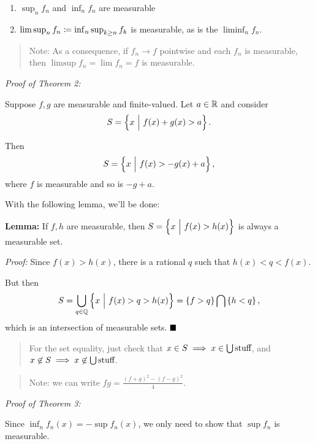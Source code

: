 \begin{enumerate}
\def\labelenumi{\arabic{enumi}.}
\tightlist
\item
  \(\sup_n f_n\) and \(\inf_n f_n\) are measurable
\item
  \(\limsup_n f_n \coloneqq \inf_n \sup_{k\geq n} f_k\) is measurable,
  as is the \(\liminf_n f_n\).
\end{enumerate}

\begin{quote}
Note: As a consequence, if \(f_n \to f\) pointwise and each \(f_n\) is
measurable, then \(\limsup f_n = \lim f_n = f\) is measurable.
\end{quote}

\emph{Proof of Theorem 2:}

Suppose \(f,g\) are measurable and finite-valued. Let \(a\in {\mathbb{R}}\) and
consider
\begin{align*}
S = \left\{{x {~\mathrel{\Big|}~} f(x) + g(x) > a }\right\}
.\end{align*}

Then
\begin{align*}
S = \left\{{ x {~\mathrel{\Big|}~} f(x) > -g(x) + a }\right\}
,\end{align*} where \(f\) is measurable and so is \(-g + a\).

With the following lemma, we'll be done:

\textbf{Lemma:} If \(f, h\) are measurable, then
\(S = \left\{{x {~\mathrel{\Big|}~} f(x) > h(x) }\right\}\) is always a measurable set.

\emph{Proof:} Since \(f(x) > h(x)\), there is a rational \(q\) such that
\(h(x) < q < f(x)\).

But then
\begin{align*}
S = \bigcup_{q\in{\mathbb{Q}}} \left\{{x {~\mathrel{\Big|}~} f(x) > q > h(x)}\right\} = \left\{{f > q}\right\} \bigcap \left\{{h < q}\right\}
,\end{align*} which is an intersection of measurable sets. \(\qed\)

\begin{quote}
For the set equality, just check that
\(x\in S \implies x \in \bigcup\text{stuff}\), and
\(x\not\in S \implies x \not \in \bigcup \text{stuff}\).
\end{quote}

\begin{quote}
Note: we can write \(fg = \frac{(f+g)^2 - (f-g)^2}{4}\).
\end{quote}

\emph{Proof of Theorem 3:}

Since \(\inf_n f_n(x) = - \sup f_n(x)\), we only need to show that
\(\sup f_n\) is measurable.

